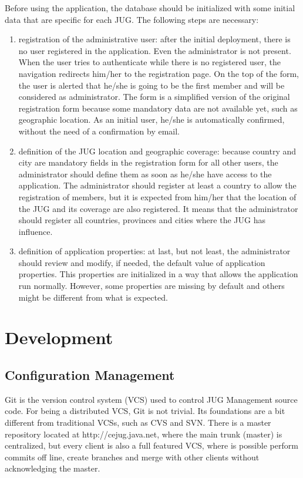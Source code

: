 \documentclass[envcountsame,envcountchap]{svmono}
\begin{document}
Before using the application, the database should be initialized with some initial data that are specific for each JUG. The following steps are necessary:

\begin{enumerate}
\item registration of the administrative user: after the initial deployment, there is no user registered in the application. Even the administrator is not present. When the user tries to authenticate while there is no registered user, the navigation redirects him/her to the registration page. On the top of the form, the user is alerted that he/she is going to be the first member and will be considered as administrator. The form is a simplified version of the original registration form because some mandatory data are not available yet, such as geographic location. As an initial user, he/she is automatically confirmed, without the need of a confirmation by email.
\item definition of the JUG location and geographic coverage: because country and city are mandatory fields in the registration form for all other users, the administrator should define them as soon as he/she have access to the application. The administrator should register at least a country to allow the registration of members, but it is expected from him/her that the location of the JUG and its coverage are also registered. It means that the administrator should register all countries, provinces and cities where the JUG has influence.
\item definition of application properties: at last, but not least, the administrator should review and modify, if needed, the default value of application properties. This properties are initialized in a way that allows the application run normally. However, some properties are missing by default and others might be different from what is expected.
\end{enumerate}

\chapter{Development}

\section{Configuration Management}

Git is the version control system (VCS) used to control JUG Management source code. For being a distributed VCS, Git is not trivial. Its foundations are a bit different from traditional VCSs, such as CVS and SVN. There is a master repository located at http://cejug.java.net, where the main trunk (master) is centralized, but every client is also a full featured VCS, where is possible perform commits off line, create branches and merge with other clients without acknowledging the master.
\end{document}
